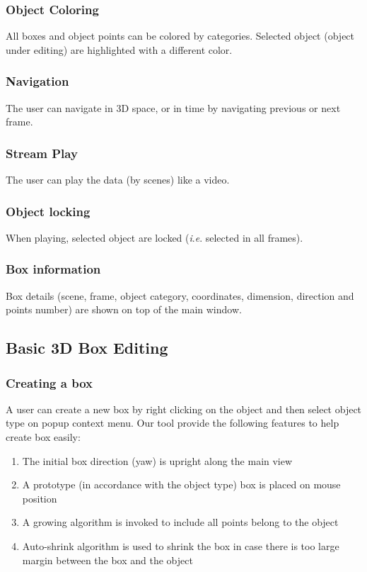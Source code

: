 \documentclass[letterpaper, 10 pt, conference]{ieeeconf}  %
\begin{document}
\subsubsection{Object Coloring}
All boxes and object points can be colored by categories. Selected object (object under editing) are highlighted with a different color.

\subsubsection{Navigation}
\label{section:navigation}
The user can navigate in 3D space, or in time by navigating previous or next frame. 

\subsubsection{Stream Play}
The user can play the data (by scenes) like a video.

\subsubsection{Object locking}
When playing, selected object are locked (\textit{i}.\textit{e}. selected in all frames).

\subsubsection{Box information}
Box details (scene, frame, object category, coordinates, dimension, direction and points number) are shown on top of the main window.
 
\subsection{Basic 3D Box Editing}

\subsubsection{Creating a box}

A user can create a new box by right clicking on the object  and then select object type on popup context menu. Our tool provide the following features to help create box easily:

\begin{enumerate}
	\item The initial box direction (yaw) is upright along the main view
	\item A prototype (in accordance with the object type) box is placed on mouse position
	\item A growing algorithm is invoked to include all points belong to the object
	\item Auto-shrink algorithm is used to shrink the box in case there is too large margin between the box and the object
\end{enumerate}
\end{document}
